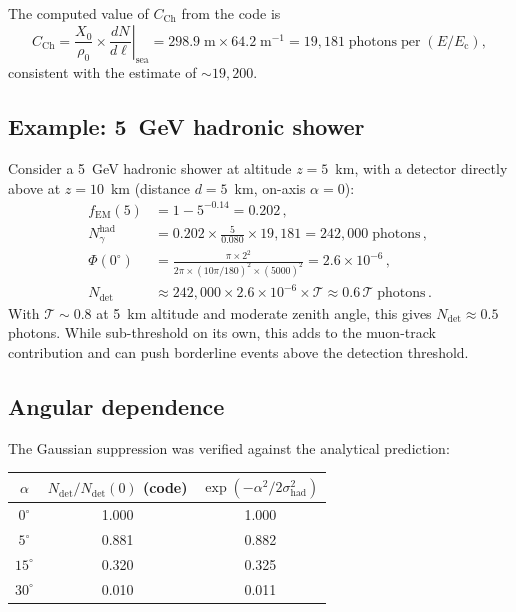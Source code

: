 \documentclass[11pt]{article}
\newcommand{\Ec}{E_{\mathrm{c}}}
\newcommand{\fEM}{f_{\mathrm{EM}}}
\newcommand{\CCH}{C_{\mathrm{Ch}}}
\newcommand{\shad}{\sigma_{\mathrm{had}}}
\begin{document}
The computed value of $\CCH$ from the code is
\begin{equation}
  \CCH = \frac{X_0}{\rho_0}
  \times \left.\frac{dN}{d\ell}\right|_{\text{sea}}
  = 298.9\;\text{m} \times 64.2\;\text{m}^{-1}
  = 19{,}181\;\text{photons}\;\text{per}\;(E/\Ec),
\end{equation}
consistent with the estimate of $\sim 19{,}200$.

\subsection{Example: 5~GeV hadronic shower}

Consider a 5~GeV hadronic shower at altitude $z = 5$~km, with a
detector directly above at $z = 10$~km (distance $d = 5$~km, on-axis
$\alpha = 0$):
\begin{align}
  \fEM(5) &= 1 - 5^{-0.14} = 0.202\,, \\
  N_{\gamma}^{\mathrm{had}} &= 0.202 \times \frac{5}{0.080}
    \times 19{,}181 = 242{,}000\;\text{photons}\,, \\
  \Phi(0^\circ) &= \frac{\pi \times 2^2}{2\pi \times
    (10\pi/180)^2 \times (5000)^2}
    = 2.6 \times 10^{-6}\,, \\
  N_{\mathrm{det}} &\approx 242{,}000 \times 2.6 \times 10^{-6}
    \times \mathcal{T}
    \approx 0.6\,\mathcal{T}\;\text{photons}\,.
\end{align}
With $\mathcal{T} \sim 0.8$ at 5~km altitude and moderate zenith angle,
this gives $N_{\mathrm{det}} \approx 0.5$ photons.  While sub-threshold
on its own, this adds to the muon-track contribution and can push
borderline events above the detection threshold.

\subsection{Angular dependence}

The Gaussian suppression was verified against the analytical prediction:

\begin{center}
\begin{tabular}{ccc}
\toprule
$\alpha$ & $N_{\mathrm{det}}/N_{\mathrm{det}}(0)$ (code) &
$\exp(-\alpha^2/2\shad^2)$ \\
\midrule
$0^\circ$  & 1.000 & 1.000 \\
$5^\circ$  & 0.881 & 0.882 \\
$15^\circ$ & 0.320 & 0.325 \\
$30^\circ$ & 0.010 & 0.011 \\
\bottomrule
\end{tabular}
\end{center}
\end{document}
